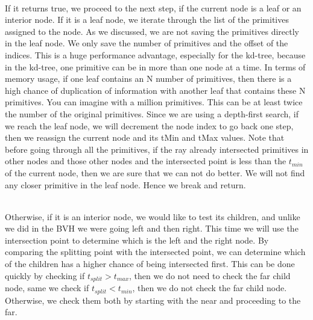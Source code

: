 \documentclass[11pt,a4paper]{article}
\begin{document}
\noindent
\\
If it returns true, we proceed to the next step, if the current node is a leaf or an interior node. If it is a leaf node, we iterate through the list of the primitives assigned to the node. As we discussed, we are not saving the primitives directly in the leaf node. We only save the number of primitives and the offset of the indices. This is a huge performance advantage, especially for the kd-tree, because in the kd-tree, one primitive can be in more than one node at a time. In terms of memory usage, if one leaf contains an N number of primitives, then there is a high chance of duplication of information with another leaf that contains these N primitives. You can imagine with a million primitives. This can be at least twice the number of the original primitives. Since we are using a depth-first search, if we reach the leaf node, we will decrement the node index to go back one step, then we reassign the current node and its tMin and tMax values. Note that before going through all the primitives, if the ray already intersected primitives in other nodes and those other nodes and the intersected point is less than the $t_{min}$ of the current node, then we are sure that we can not do better. We will not find any closer primitive in the leaf node. Hence we break and return. 

\noindent
\\
Otherwise, if it is an interior node, we would like to test its children, and unlike we did in the BVH we were going left and then right. This time we will use the intersection point to determine which is the left and the right node. By comparing the splitting point with the intersected point, we can determine which of the children has a higher chance of being intersected first. This can be done quickly by checking if $t_{split} > t_{max}$, then we do not need to check the far child node, same we check if $t_{split} < t_{min}$, then we do not check the far child node. Otherwise, we check them both by starting with the near and proceeding to the far. 
\end{document}
